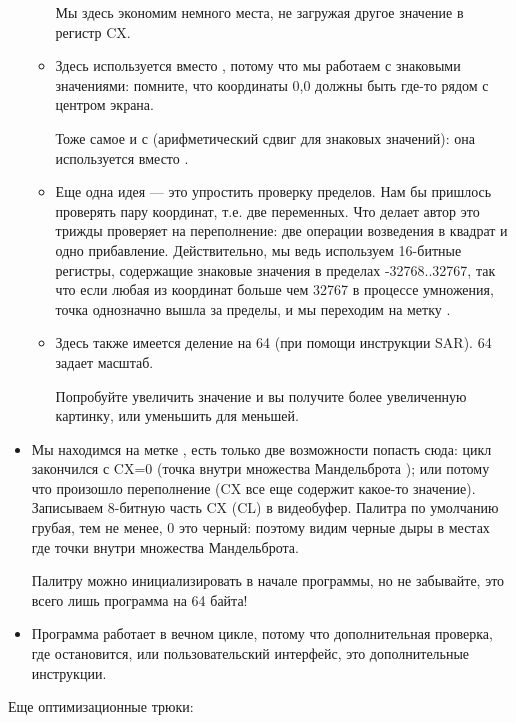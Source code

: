 \begin{itemize}
\begin{itemize}
Мы здесь экономим немного места, не загружая другое значение в регистр CX.

     \item Здесь используется  вместо , потому что мы работаем с знаковыми значениями:
помните, что координаты 0,0 должны быть где-то рядом с центром экрана.

Тоже самое и с  (арифметический сдвиг для знаковых значений): она используется вместо .


     \item Еще одна идея --- это упростить проверку пределов.
Нам бы пришлось проверять пару координат, т.е. две переменных.
Что делает автор это трижды проверяет на переполнение: две операции возведения в квадрат и одно 
прибавление.
Действительно, мы ведь используем 16-битные регистры, содержащие знаковые значения в пределах
 -32768..32767, так что
если любая из координат больше чем 32767 в процессе умножения, точка однозначно вышла за пределы,
и мы переходим на метку .


     \item Здесь также имеется деление на 64 (при помощи инструкции SAR). 64 задает масштаб.

Попробуйте увеличить значение и вы получите более увеличенную картинку, или уменьшить для
меньшей.


    \end{itemize}

\item Мы находимся на метке , есть только две возможности
попасть сюда: 
цикл закончился с CX=0 (точка внутри множества Мандельброта
); или потому что произошло переполнение (CX все еще содержит 
какое-то значение).
Записываем 8-битную часть CX (CL) в видеобуфер.
Палитра по умолчанию грубая, тем не менее, 0 это черный: поэтому видим черные дыры в местах где точки
внутри множества Мандельброта.

Палитру можно инициализировать в начале программы, но не забывайте, это всего лишь программа на 64 
байта!

\item Программа работает в вечном цикле, потому что дополнительная проверка, где остановится, 
или пользовательский интерфейс, это дополнительные инструкции.

\end{itemize}

Еще оптимизационные трюки:

